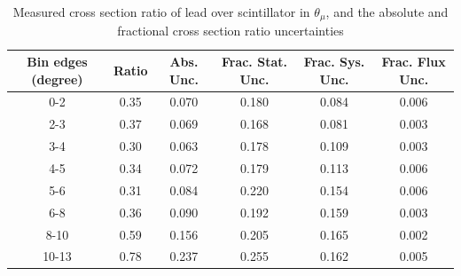 \documentclass[../main.tex]{subfiles}
\begin{document}
\begin{table}
  \centering
  \renewcommand{\arraystretch}{1.15}
  \caption{Systematic covariance matrix of measured cross section ratio of lead over scintillator in $p_{\mu}$}
  \label{tbl:rationucleonnuc82muon_pc}
\end{table}
\begin{table}
  \centering
  \renewcommand{\arraystretch}{1.15}
  \caption{Measured cross section ratio of lead over scintillator in $\theta_{\mu}$, and the absolute and fractional cross section ratio uncertainties}
    \begin{tabular}{c||c|c||c|c|c}
      Bin edges (degree) &  Ratio  &  Abs. Unc.  &  Frac. Stat. Unc.  &  Frac. Sys. Unc.  &  Frac. Flux Unc. \\
      \hline
      \hline
      0-2 & 0.35 & 0.070 & 0.180 & 0.084 & 0.006\\
      2-3 & 0.37 & 0.069 & 0.168 & 0.081 & 0.003\\
      3-4 & 0.30 & 0.063 & 0.178 & 0.109 & 0.003\\
      4-5 & 0.34 & 0.072 & 0.179 & 0.113 & 0.006\\
      5-6 & 0.31 & 0.084 & 0.220 & 0.154 & 0.006\\
      6-8 & 0.36 & 0.090 & 0.192 & 0.159 & 0.003\\
      8-10 & 0.59 & 0.156 & 0.205 & 0.165 & 0.002\\
      10-13 & 0.78 & 0.237 & 0.255 & 0.162 & 0.005
    \end{tabular}
  \label{tbl:rationucleonnuc82muon_thetaa}
\end{table}
\end{document}
